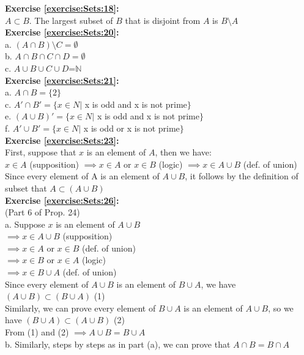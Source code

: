 \noindent\textbf{Exercise \ref{exercise:Sets:18}:}\\
$A\subset B$. The largest subset of $B$ that is disjoint from $A$ is $B\setminus A$\\

\noindent\textbf{Exercise \ref{exercise:Sets:20}:}\\
a. $(A\cap B)\setminus C=\emptyset$\\
b. $A\cap B\cap C\cap D=\emptyset$\\
c. $A \cup B \cup C \cup D$=$\mathbb{N}$\\

\noindent\textbf{Exercise \ref{exercise:Sets:21}:}\\
a. $A\cap B=\{2\}$\\
c. $A'\cap B'=\{x\in N|$ x is odd and x is not prime$\}$\\
e. $(A\cup B)'=\{x\in N|$ x is odd and x is not prime$\}$\\
f. $A'\cup B'=\{x\in N|$ x is odd or x is not prime$\}$\\

\noindent\textbf{Exercise \ref{exercise:Sets:23}:}\\
First, suppose that $x$ is an element of $A$, then we have:\\
$x\in A$ (supposition) $\implies x\in A$ or $x\in B$ (logic) $\implies x\in A\cup B$ (def. of union)\\
Since every element of A is an element of $A\cup B$, it follows by the definition of subset that $A\subset (A\cup B)$\\


\noindent\textbf{Exercise \ref{exercise:Sets:26}:}\\
(Part 6 of Prop. 24)\\
a. Suppose $x$ is an element of $A\cup B$\\
$\implies x\in A\cup B$ (supposition)\\
$\implies x\in A$ or $x\in B$ (def. of union)\\
$\implies x\in B$ or $x\in A$ (logic)\\
$\implies x\in B\cup A$ (def. of union)\\
Since every element of $A\cup B$ is an element of $B\cup A$, we have $(A\cup B)\subset(B\cup A)$ (1)\\
Similarly, we can prove every element of $B\cup A$ is an element of $A\cup B$, so we have $(B\cup A)\subset (A\cup B)$ (2)\\
From (1) and (2) $\implies A\cup B = B\cup A$\\
b. Similarly, steps by steps as in part (a), we can prove that $A\cap B=B\cap A$\\

